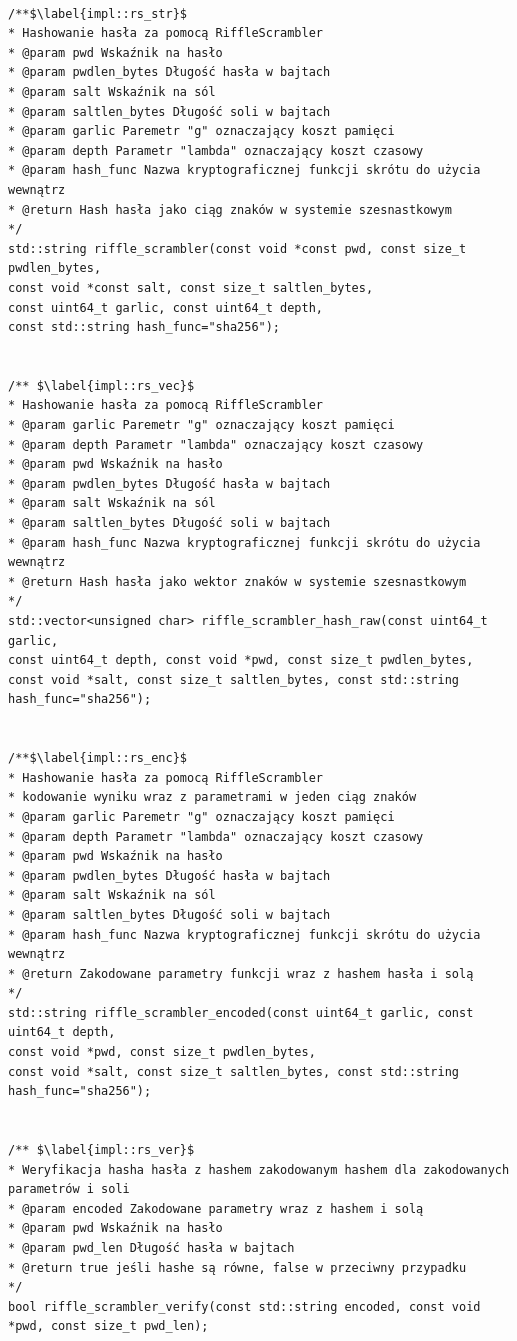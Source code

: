 \begin{verbatim}

/**$\label{impl::rs_str}$
* Hashowanie hasła za pomocą RiffleScrambler 
* @param pwd Wskaźnik na hasło
* @param pwdlen_bytes Długość hasła w bajtach
* @param salt Wskaźnik na sól
* @param saltlen_bytes Długość soli w bajtach
* @param garlic Paremetr "g" oznaczający koszt pamięci
* @param depth Parametr "lambda" oznaczający koszt czasowy
* @param hash_func Nazwa kryptograficznej funkcji skrótu do użycia wewnątrz
* @return Hash hasła jako ciąg znaków w systemie szesnastkowym
*/
std::string riffle_scrambler(const void *const pwd, const size_t pwdlen_bytes,
const void *const salt, const size_t saltlen_bytes,
const uint64_t garlic, const uint64_t depth,
const std::string hash_func="sha256");


/** $\label{impl::rs_vec}$
* Hashowanie hasła za pomocą RiffleScrambler
* @param garlic Paremetr "g" oznaczający koszt pamięci
* @param depth Parametr "lambda" oznaczający koszt czasowy
* @param pwd Wskaźnik na hasło
* @param pwdlen_bytes Długość hasła w bajtach
* @param salt Wskaźnik na sól
* @param saltlen_bytes Długość soli w bajtach
* @param hash_func Nazwa kryptograficznej funkcji skrótu do użycia wewnątrz
* @return Hash hasła jako wektor znaków w systemie szesnastkowym
*/
std::vector<unsigned char> riffle_scrambler_hash_raw(const uint64_t garlic,
const uint64_t depth, const void *pwd, const size_t pwdlen_bytes,
const void *salt, const size_t saltlen_bytes, const std::string hash_func="sha256");


/**$\label{impl::rs_enc}$
* Hashowanie hasła za pomocą RiffleScrambler  
* kodowanie wyniku wraz z parametrami w jeden ciąg znaków
* @param garlic Paremetr "g" oznaczający koszt pamięci
* @param depth Parametr "lambda" oznaczający koszt czasowy
* @param pwd Wskaźnik na hasło
* @param pwdlen_bytes Długość hasła w bajtach
* @param salt Wskaźnik na sól
* @param saltlen_bytes Długość soli w bajtach
* @param hash_func Nazwa kryptograficznej funkcji skrótu do użycia wewnątrz
* @return Zakodowane parametry funkcji wraz z hashem hasła i solą
*/
std::string riffle_scrambler_encoded(const uint64_t garlic, const uint64_t depth,
const void *pwd, const size_t pwdlen_bytes,
const void *salt, const size_t saltlen_bytes, const std::string hash_func="sha256");


/** $\label{impl::rs_ver}$
* Weryfikacja hasha hasła z hashem zakodowanym hashem dla zakodowanych parametrów i soli
* @param encoded Zakodowane parametry wraz z hashem i solą
* @param pwd Wskaźnik na hasło
* @param pwd_len Długość hasła w bajtach
* @return true jeśli hashe są równe, false w przeciwny przypadku
*/
bool riffle_scrambler_verify(const std::string encoded, const void *pwd, const size_t pwd_len);


\end{verbatim}

